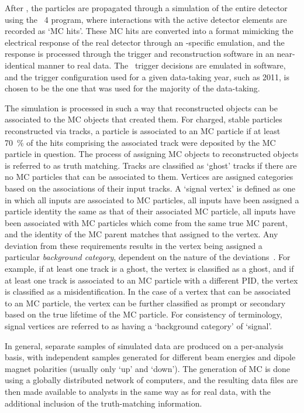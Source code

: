 After \evtgen, the particles are propagated through a simulation of the entire 
detector using the \geant\ 4 program, where interactions with the active 
detector elements are recorded as `\ac{MC} hits'.
These \ac{MC} hits are converted into a format mimicking the electrical 
response of the real detector through an \lhcb-specific emulation, and the 
response is processed through the trigger and reconstruction software in an 
near-identical manner to real data.
The \lzero\ trigger decisions are emulated in software, and the trigger 
configuration used for a given data-taking year, such as 2011, is chosen to be 
the one that was used for the majority of the data-taking.

The simulation is processed in such a way that reconstructed objects can be 
associated to the \ac{MC} objects that created them.
For charged, stable particles reconstructed via tracks, a particle is 
associated to an \ac{MC} particle if at least \SI{70}{\percent} of the hits 
comprising the associated track were deposited by the \ac{MC} particle in 
question.
The process of assigning \ac{MC} objects to reconstructed objects is referred 
to as truth matching.
Tracks are classified as `ghost' tracks if there are no \ac{MC} particles that 
can be associated to them.
Vertices are assigned categories based on the associations of their input 
tracks.
A `signal vertex' is defined as one in which all inputs are associated to 
\ac{MC} particles, all inputs have been assigned a particle identity the same 
as that of their associated \ac{MC} particle, all inputs have been associated 
with \ac{MC} particles which come from the same true \ac{MC} parent, and the 
identity of the \ac{MC} parent matches that assigned to the vertex.
Any deviation from these requirements results in the vertex being assigned a 
particular \emph{background category}, dependent on the nature of the 
deviations~\cite{Gligorov:1035682}.
For example, if at least one track is a ghost, the vertex is classified as a 
ghost, and if at least one track is associated to an \ac{MC} particle with a 
different \ac{PID}, the vertex is classified as a misidentification.
In the case of a vertex that can be associated to an \ac{MC} particle, the 
vertex can be further classified as prompt or secondary based on the true 
lifetime of the \ac{MC} particle.
For consistency of terminology, signal vertices are referred to as having a 
`background category' of `signal'.

In general, separate samples of simulated data are produced on a per-analysis 
basis, with independent samples generated for different beam energies and 
dipole magnet polarities (usually only `up' and `down').
The generation of \ac{MC} is done using a globally distributed network of 
computers, and the resulting data files are then made available to analysts in 
the same way as for real data, with the additional inclusion of the 
truth-matching information.
